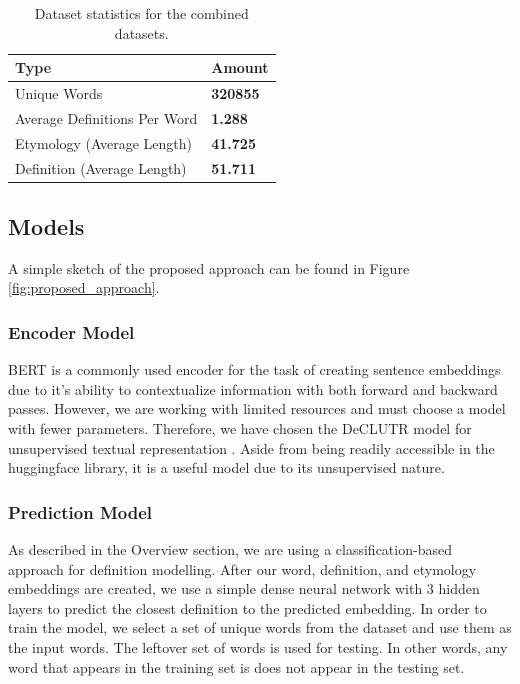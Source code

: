 \documentclass[11pt,a4paper]{article}
\begin{document}
\begin{table}[h]
  \centering
  \begin{tabular}{|l|l|}
    \hline
    \textbf{Type}                & \textbf{Amount} \\
    \hline\hline
    Unique Words                 & \textbf{320855} \\
    Average Definitions Per Word & \textbf{1.288}  \\
    Etymology (Average Length)   & \textbf{41.725} \\
    Definition (Average Length)  & \textbf{51.711} \\
    \hline
  \end{tabular}
  \caption{Dataset statistics for the combined datasets.}
  \label{tab:dataset_stats}
\end{table}

\subsection{Models}

A simple sketch of the proposed approach can be found in Figure
\ref{fig:proposed_approach}.

\subsubsection{Encoder Model}
BERT \cite{peters_deep_2018} is a commonly used encoder for the task of creating
sentence embeddings due to it's ability to contextualize information with both
forward and backward passes. However, we are working with limited resources and
must choose a model with fewer parameters. Therefore, we have chosen the DeCLUTR
model for unsupervised textual representation \cite{john_decluter_2020}. Aside
from being readily accessible in the huggingface library, it is a useful model
due to its unsupervised nature.

\subsubsection{Prediction Model}
As described in the Overview section, we are using a classification-based
approach for definition modelling. After our word, definition, and etymology
embeddings are created, we use a simple dense neural network with 3 hidden
layers to predict the closest definition to the predicted embedding. In order to
train the model, we select a set of unique words from the dataset and use them
as the input words. The leftover set of words is used for testing. In other
words, any word that appears in the training set is does not appear in the
testing set.
\end{document}
